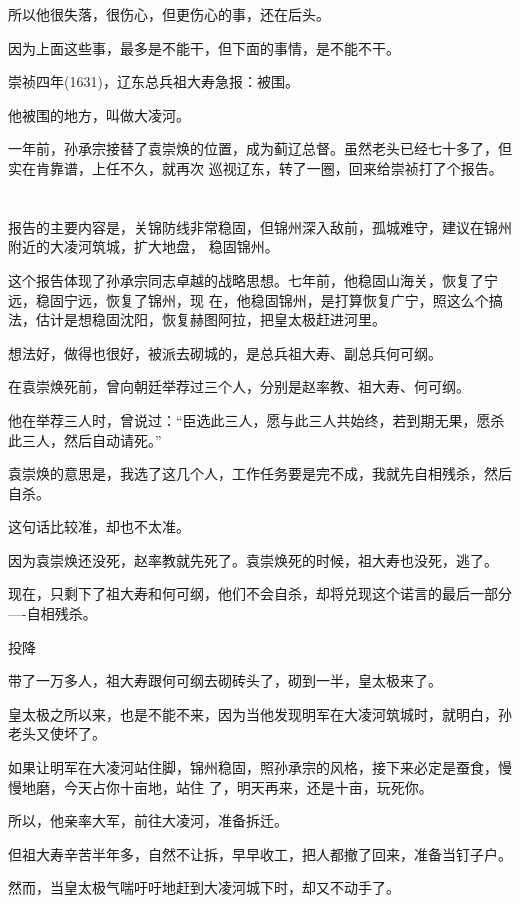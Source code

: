 \documentclass[11pt,a4paper,onecolumn]{article}
\begin{document}
所以他很失落，很伤心，但更伤心的事，还在后头。

因为上面这些事，最多是不能干，但下面的事情，是不能不干。

崇祯四年(1631)，辽东总兵祖大寿急报：被围。

他被围的地方，叫做大凌河。

一年前，孙承宗接替了袁崇焕的位置，成为蓟辽总督。虽然老头已经七十多了，但实在肯靠谱，上任不久，就再次
巡视辽东，转了一圈，回来给崇祯打了个报告。

\section[\thesection]{}

报告的主要内容是，关锦防线非常稳固，但锦州深入敌前，孤城难守，建议在锦州附近的大凌河筑城，扩大地盘，
稳固锦州。

这个报告体现了孙承宗同志卓越的战略思想。七年前，他稳固山海关，恢复了宁远，稳固宁远，恢复了锦州，现
在，他稳固锦州，是打算恢复广宁，照这么个搞法，估计是想稳固沈阳，恢复赫图阿拉，把皇太极赶进河里。

想法好，做得也很好，被派去砌城的，是总兵祖大寿、副总兵何可纲。

在袁崇焕死前，曾向朝廷举荐过三个人，分别是赵率教、祖大寿、何可纲。

他在举荐三人时，曾说过：``臣选此三人，愿与此三人共始终，若到期无果，愿杀此三人，然后自动请死。''

袁崇焕的意思是，我选了这几个人，工作任务要是完不成，我就先自相残杀，然后自杀。

这句话比较准，却也不太准。

因为袁崇焕还没死，赵率教就先死了。袁崇焕死的时候，祖大寿也没死，逃了。

现在，只剩下了祖大寿和何可纲，他们不会自杀，却将兑现这个诺言的最后一部分----自相残杀。

投降

带了一万多人，祖大寿跟何可纲去砌砖头了，砌到一半，皇太极来了。

皇太极之所以来，也是不能不来，因为当他发现明军在大凌河筑城时，就明白，孙老头又使坏了。

如果让明军在大凌河站住脚，锦州稳固，照孙承宗的风格，接下来必定是蚕食，慢慢地磨，今天占你十亩地，站住
了，明天再来，还是十亩，玩死你。

所以，他亲率大军，前往大凌河，准备拆迁。

但祖大寿辛苦半年多，自然不让拆，早早收工，把人都撤了回来，准备当钉子户。

然而，当皇太极气喘吁吁地赶到大凌河城下时，却又不动手了。
\end{document}
